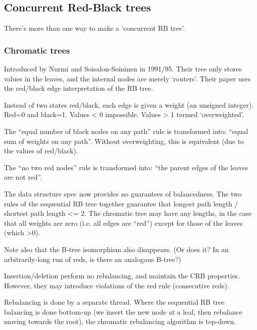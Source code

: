\subsection{Concurrent Red-Black trees}

There’s more than one way to make a ‘concurrent RB tree’.


\subsubsection{Chromatic trees}

Introduced by Nurmi and Soisalon-Soininen in 1991/95.
Their tree only stores values in the leaves,
  and the internal nodes are merely ‘routers’.\footnotemark
Their paper uses the red/black edge interpretation of the RB tree.



Instead of two states red/black,
  each edge is given a weight (an unsigned integer).
Red=0 and black=1.  Values < 0 impossible.  Values > 1 termed ‘overweighted’.

The \enquote{equal number of black nodes on any path} rule
  is transformed into:
  \enquote{equal sum of weights on any path}.
Without overweighting,
  this is equivalent (due to the values of red/black).

The \enquote{no two red nodes} rule is transformed into:
\enquote{the parent edges of the leaves are not red}.

The data structure spec now provides no guarantees of balancedness.
The two rules of the sequential RB tree together guarantee that
  longest path length / shortest path length <= 2.
The chromatic tree may have any lengths,
  in the case that all weights are zero (i.e. all edges are \enquote{red}) except for those of the leaves (which >0).

Note also that the B-tree isomorphism also disappears.
(Or does it?  In an arbitrarily-long run of reds, is there an analogous B-tree?)

Insertion/deletion perform no rebalancing,
  and maintain the CRB properties.
However, they may introduce violations of the red rule (consecutive reds).

Rebalancing is done by a separate thread.
Where the sequential RB tree balancing is done bottom-up
  (we insert the new node at a leaf,
  then rebalance moving towards the root),
  the chromatic rebalancing algorithm is top-down.

